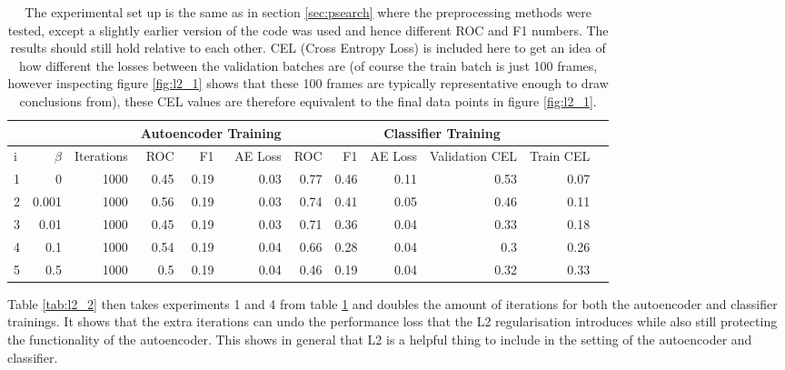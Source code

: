           \begin{table}[!h] {\footnotesize \centering
          \begin{tabular}{lrrrrrrrrrrr}
              &&&   \multicolumn{3}{|c|}{Autoencoder Training} &  \multicolumn{5}{c|}{Classifier Training}  \\
            \hline
             i & $\beta$ &   Iterations &   ROC&F1&AE Loss & ROC & F1 & AE Loss &   Validation CEL &   Train CEL \\
            \hline
             1 &     0     & 1000 &    0.45 &   0.19 &     0.03 &    0.77 &   0.46 &     0.11 &  0.53 &  0.07 \\
             2 &     0.001 & 1000 &    0.56 &   0.19 &     0.03 &    0.74 &   0.41 &     0.05 &  0.46 &  0.11 \\
             3 &     0.01  & 1000 &    0.45 &   0.19 &     0.03 &    0.71 &   0.36 &     0.04 &  0.33 &  0.18 \\
             4 &     0.1   & 1000 &    0.54 &   0.19 &     0.04 &    0.66 &   0.28 &     0.04 &  0.3  &  0.26 \\
             5 &     0.5   & 1000 &    0.5  &   0.19 &     0.04 &    0.46 &   0.19 &     0.04 &  0.32 &  0.33 \\
            \hline
          \end{tabular}
            \caption{The experimental set up is the same as in section \ref{sec:psearch} where the preprocessing methods
            were tested, except a slightly earlier version
            of the code was used and hence different ROC and F1 numbers.
            The results should still hold relative to each other.
            CEL (Cross Entropy Loss) is included here to get an idea of how different
            the losses between the validation batches are (of course the
            train batch is just 100 frames, however inspecting figure \ref{fig:l2_1} shows that
            these 100 frames are typically representative enough to draw conclusions from), these
            CEL values are therefore equivalent to the final data points in figure \ref{fig:l2_1}. } \label{tab:l2_1}
          }
          \end{table}

        Table \ref{tab:l2_2} then takes experiments 1 and 4 from table \ref{tab:l2_1} and doubles
        the amount of iterations for both the autoencoder and classifier trainings. It shows
        that the extra iterations can undo the performance loss that the L2 regularisation
        introduces while also still protecting the functionality of the autoencoder.
        This shows in general that L2 is a helpful thing to include in the setting of the autoencoder
        and classifier.

